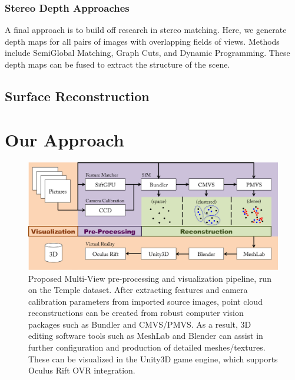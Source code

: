 \documentclass[10pt,twocolumn,letterpaper]{article}
\begin{document}
\subsubsection{Stereo Depth Approaches}

A final approach is to build off research in stereo matching. Here, we generate depth maps for all pairs of images with overlapping fields of views. Methods include SemiGlobal Matching, Graph Cuts, and Dynamic Programming.\cite{sgm,taxonomy} These depth maps can be fused to extract the structure of the scene.\cite{fuse}


\subsection{Surface Reconstruction}

\section{Our Approach}

\begin{figure}[t]
  \begin{center}
    \includegraphics[width=\linewidth]{pipeline.png}
  \end{center}
  \caption{Proposed Multi-View pre-processing and visualization pipeline, run on the Temple dataset.\cite{middlebury}  After extracting features and camera calibration parameters from imported source images, point cloud reconstructions can be created from robust computer vision packages such as Bundler and CMVS/PMVS.  As a result, 3D editing software tools such as MeshLab and Blender can assist in further configuration and production of detailed meshes/textures.  These can be visualized in the Unity3D game engine, which supports Oculus Rift OVR integration.}
  \label{fig:short}
\end{figure}
\end{document}

